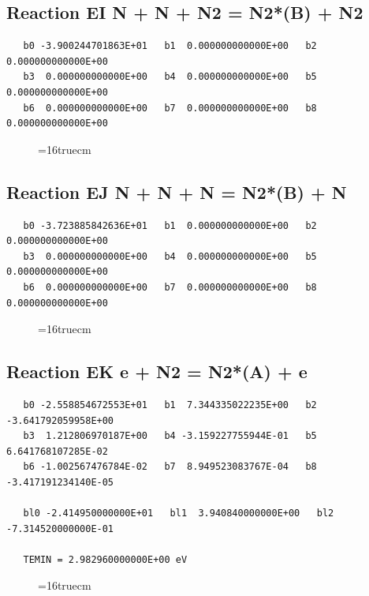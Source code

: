\documentclass[12pt,dvipdfm]{article}
\begin{document}
\subsection{
Reaction EI N + N + N2 = N2*(B) + N2 }
\begin{small}\begin{verbatim}
   b0 -3.900244701863E+01   b1  0.000000000000E+00   b2  0.000000000000E+00
   b3  0.000000000000E+00   b4  0.000000000000E+00   b5  0.000000000000E+00
   b6  0.000000000000E+00   b7  0.000000000000E+00   b8  0.000000000000E+00
\end{verbatim}\end{small}
\begin{figure}[h!] \label{n2rates}
\epsfxsize=16truecm
\end{figure}
\newpage

\subsection{
Reaction EJ N + N + N = N2*(B) + N }
\begin{small}\begin{verbatim}
   b0 -3.723885842636E+01   b1  0.000000000000E+00   b2  0.000000000000E+00
   b3  0.000000000000E+00   b4  0.000000000000E+00   b5  0.000000000000E+00
   b6  0.000000000000E+00   b7  0.000000000000E+00   b8  0.000000000000E+00
\end{verbatim}\end{small}
\begin{figure}[h!] \label{n2rates}
\epsfxsize=16truecm
\end{figure}
\newpage

\subsection{
Reaction EK e + N2 = N2*(A) + e }
\begin{small}\begin{verbatim}
   b0 -2.558854672553E+01   b1  7.344335022235E+00   b2 -3.641792059958E+00
   b3  1.212806970187E+00   b4 -3.159227755944E-01   b5  6.641768107285E-02
   b6 -1.002567476784E-02   b7  8.949523083767E-04   b8 -3.417191234140E-05

   bl0 -2.414950000000E+01   bl1  3.940840000000E+00   bl2 -7.314520000000E-01

   TEMIN = 2.982960000000E+00 eV
\end{verbatim}\end{small}
\begin{figure}[h!] \label{n2rates}
\epsfxsize=16truecm
\end{figure}
\newpage
\end{document}
